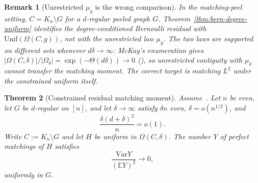 \documentclass[11pt]{article}
\newtheorem{theorem}{Theorem}
\newtheorem{remark}[theorem]{Remark}
\newcommand{\EE}{\mathbb{E}}
\newcommand{\Var}{\mathrm{Var}}
\begin{document}
\begin{remark}[Unrestricted \(\mu_g\) is the wrong comparison]
\label{rem:residual-not-unrestricted}
In the matching-peel setting, \(C=K_n\setminus G\) for a \(d\)-regular peeled
graph \(G\). Theorem~\ref{thm:bern-degree-uniform} identifies the
degree-conditioned Bernoulli residual with
\(\mathrm{Unif}(\Omega(C,g))\), not with the unrestricted law \(\mu_g\).
The two laws are supported on different sets whenever \(d\delta\to\infty\):
McKay's enumeration gives
\(\lvert\Omega(C,\delta)\rvert/\lvert\Omega_\delta\rvert=\exp(-\Theta(d\delta))\to0\)
(\cite[Lemma~free-flat]{PlusOneV1}), so unrestricted contiguity with
\(\mu_\delta\) cannot transfer the matching moment. The correct target is
matching \(L^2\) under the constrained uniform itself.
\end{remark}

\begin{theorem}[Constrained residual matching moment]
\label{thm:residual-matching-constrained}
Assume~\cite[Theorem~4.6]{McK85}. Let \(n\) be even, let \(G\) be \(d\)-regular
on \([n]\), and let \(\delta\to\infty\) satisfy \(\delta n\) even,
\(\delta=o(n^{1/2})\), and
\[
\frac{\delta(d+\delta)^2}{n}=o(1).
\]
Write \(C:=K_n\setminus G\) and let \(H\) be uniform in \(\Omega(C,\delta)\). The
number \(Y\) of perfect matchings of \(H\) satisfies
\[
\frac{\Var Y}{(\EE Y)^2}\to0,
\]
uniformly in \(G\).
\end{theorem}
\end{document}
